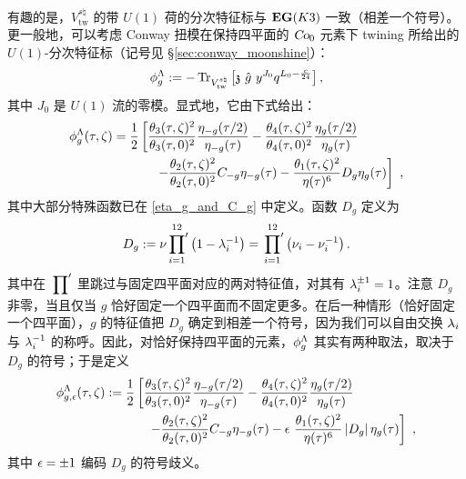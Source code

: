 有趣的是，$V^{s\natural}_{\text{tw}}$ 的带 $U(1)$ 荷的分次特征标与 ${\bf EG}(K3)$ 一致（相差一个符号）\cite{MR3465528}。更一般地，可以考虑 Conway 扭模在保持四平面的 $\operatorname{\textsl{Co}}_0$ 元素下 twining 所给出的 $U(1)$-分次特征标（记号见 \S \ref{sec:conway_moonshine}）：
\begin{equation}
\phi_g^\Lambda:=-\operatorname{Tr}_{V^{s\natural}_{\text{tw}}}\left[\mathfrak{z}~\hat{g}~y^{J_0}q^{L_0-\frac{c}{24}}\right],
\end{equation}
其中 $J_0$ 是 $U(1)$ 流的零模。显式地，它由下式给出：
\begin{equation}
\label{eq:phi_g}
\begin{split}
\phi_g^\Lambda(\tau,\zeta)&=\frac{1}{2}\left[\frac{\theta_3(\tau,\zeta)^2}{\theta_3(\tau,0)^2}\frac{\eta_{-g}(\tau/2)}{\eta_{-g}(\tau)}-\frac{\theta_4(\tau,\zeta)^2}{\theta_4(\tau,0)^2}\frac{\eta_{g}(\tau/2)}{\eta_{g}(\tau)}\right. \\
&~~~~~~~~~~\left.-\frac{\theta_2(\tau,\zeta)^2}{\theta_2(\tau,0)^2}C_{-g}\eta_{-g}(\tau)-\frac{\theta_1(\tau,\zeta)^2}{\eta(\tau)^6}D_g\eta_g(\tau)\right]~,
\end{split}
\end{equation}
其中大部分特殊函数已在 \eqref{eta_g_and_C_g} 中定义。函数 $D_g$ 定义为
\begin{equation}
D_g:=\nu\sideset{}{'}\prod_{i=1}^{12}\left(1-\lambda_i^{-1}\right)=\sideset{}{'}\prod_{i=1}^{12}\left(\nu_i-\nu_i^{-1}\right).
\end{equation}
其中在 $\sideset{}{'}\prod$ 里跳过与固定四平面对应的两对特征值，对其有 $\lambda_i^{\pm1}=1$。注意 $D_g$ 非零，当且仅当 $g$ 恰好固定一个四平面而不固定更多。在后一种情形（恰好固定一个四平面），$g$ 的特征值把 $D_g$ 确定到相差一个符号，因为我们可以自由交换 $\lambda_i$ 与 $\lambda_i^{-1}$ 的称呼。因此，对恰好保持四平面的元素，$\phi_g^\Lambda$ 其实有两种取法，取决于 $D_{g}$ 的符号；于是定义
\begin{equation}
\begin{split}\label{eq:phi_epsilon}
\phi^\Lambda_{g,\epsilon}(\tau,\zeta)&:=\frac{1}{2}\left[\frac{\theta_3(\tau,\zeta)^2}{\theta_3(\tau,0)^2}\frac{\eta_{-g}(\tau/2)}{\eta_{-g}(\tau)}-\frac{\theta_4(\tau,\zeta)^2}{\theta_4(\tau,0)^2}\frac{\eta_{g}(\tau/2)}{\eta_{g}(\tau)}\right. \\
&~~~~~~~~~~\left.-\frac{\theta_2(\tau,\zeta)^2}{\theta_2(\tau,0)^2}C_{-g}\eta_{-g}(\tau)-\epsilon~\frac{\theta_1(\tau,\zeta)^2}{\eta(\tau)^6}\left|D_g\right|\eta_g(\tau)\right]~,
\end{split}
\end{equation}
其中 $\epsilon=\pm1$ 编码 $D_g$ 的符号歧义。

